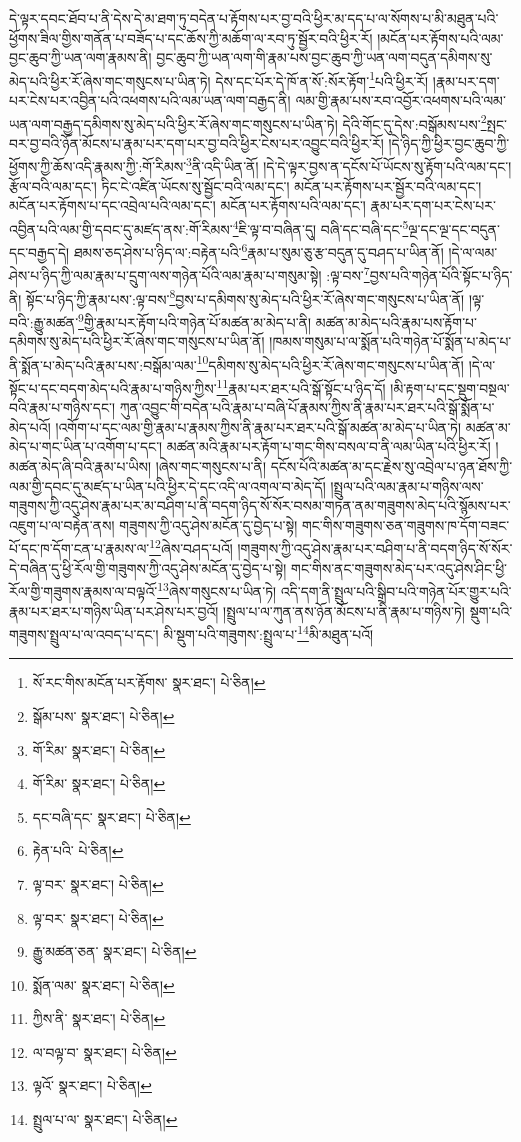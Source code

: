 དེ་ལྟར་དབང་ཐོབ་པ་ནི་དེས་དེ་མ་ཐག་ཏུ་བདེན་པ་རྟོགས་པར་བྱ་བའི་ཕྱིར་མ་དད་པ་ལ་སོགས་པ་མི་མཐུན་པའི་ཕྱོགས་ཟིལ་གྱིས་གནོན་པ་བཟོད་པ་དང་ཆོས་ཀྱི་མཆོག་ལ་རབ་ཏུ་སྦྱོར་བའི་ཕྱིར་རོ། །མངོན་པར་རྟོགས་པའི་ལམ་བྱང་ཆུབ་ཀྱི་ཡན་ལག་རྣམས་ནི། བྱང་ཆུབ་ཀྱི་ཡན་ལག་གི་རྣམ་པས་བྱང་ཆུབ་ཀྱི་ཡན་ལག་བདུན་དམིགས་སུ་མེད་པའི་ཕྱིར་རོ་ཞེས་གང་གསུངས་པ་ཡིན་ཏེ། དེས་དང་པོར་དེ་ཁོ་ན་སོ་:སོར་རྟོག་\footnote{སོ་རང་གིས་མངོན་པར་རྟོགས་  སྣར་ཐང་།  པེ་ཅིན། }པའི་ཕྱིར་རོ། །རྣམ་པར་དག་པར་ངེས་པར་འབྱིན་པའི་འཕགས་པའི་ལམ་ཡན་ལག་བརྒྱད་ནི། ལམ་གྱི་རྣམ་པས་རབ་འབྱོར་འཕགས་པའི་ལམ་ཡན་ལག་བརྒྱད་དམིགས་སུ་མེད་པའི་ཕྱིར་རོ་ཞེས་གང་གསུངས་པ་ཡིན་ཏེ། དེའི་གོང་དུ་དེས་:བསྒོམས་པས་\footnote{སྒོམ་པས་  སྣར་ཐང་།  པེ་ཅིན། }སྤང་བར་བྱ་བའི་ཉོན་མོངས་པ་རྣམ་པར་དག་པར་བྱ་བའི་ཕྱིར་ངེས་པར་འབྱུང་བའི་ཕྱིར་རོ། །དེ་ཉིད་ཀྱི་ཕྱིར་བྱང་ཆུབ་ཀྱི་ཕྱོགས་ཀྱི་ཆོས་འདི་རྣམས་ཀྱི་:གོ་རིམས་\footnote{གོ་རིམ་  སྣར་ཐང་།  པེ་ཅིན། }ནི་འདི་ཡིན་ནོ། །དེ་དེ་ལྟར་བྱས་ན་དངོས་པོ་ཡོངས་སུ་རྟོག་པའི་ལམ་དང་། རྩོལ་བའི་ལམ་དང་། ཏིང་ངེ་འཛིན་ཡོངས་སུ་སྦྱོང་བའི་ལམ་དང་། མངོན་པར་རྟོགས་པར་སྦྱོར་བའི་ལམ་དང་། མངོན་པར་རྟོགས་པ་དང་འབྲེལ་པའི་ལམ་དང་། མངོན་པར་རྟོགས་པའི་ལམ་དང་། རྣམ་པར་དག་པར་ངེས་པར་འབྱིན་པའི་ལམ་གྱི་དབང་དུ་མཛད་ནས་:གོ་རིམས་\footnote{གོ་རིམ་  སྣར་ཐང་།  པེ་ཅིན། }ཇི་ལྟ་བ་བཞིན་དུ། བཞི་དང་བཞི་དང་\footnote{དང་བཞི་དང་  སྣར་ཐང་།  པེ་ཅིན། }ལྔ་དང་ལྔ་དང་བདུན་དང་བརྒྱད་དེ། ཐམས་ཅད་ཤེས་པ་ཉིད་ལ་:བརྟེན་པའི་\footnote{རྟེན་པའི་  པེ་ཅིན། }རྣམ་པ་སུམ་ཅུ་རྩ་བདུན་དུ་བཤད་པ་ཡིན་ནོ། །དེ་ལ་ལམ་ཤེས་པ་ཉིད་ཀྱི་ལམ་རྣམ་པ་དྲུག་ལས་གཉེན་པོའི་ལམ་རྣམ་པ་གསུམ་སྟེ། :ལྟ་བས་\footnote{ལྟ་བར་  སྣར་ཐང་།  པེ་ཅིན། }བྱས་པའི་གཉེན་པོའི་སྟོང་པ་ཉིད་ནི། སྟོང་པ་ཉིད་ཀྱི་རྣམ་པས་:ལྟ་བས་\footnote{ལྟ་བར་  སྣར་ཐང་།  པེ་ཅིན། }བྱས་པ་དམིགས་སུ་མེད་པའི་ཕྱིར་རོ་ཞེས་གང་གསུངས་པ་ཡིན་ནོ། །ལྟ་བའི་:རྒྱུ་མཚན་\footnote{རྒྱུ་མཚན་ཅན་  སྣར་ཐང་།  པེ་ཅིན། }གྱི་རྣམ་པར་རྟོག་པའི་གཉེན་པོ་མཚན་མ་མེད་པ་ནི། མཚན་མ་མེད་པའི་རྣམ་པས་རྟོག་པ་དམིགས་སུ་མེད་པའི་ཕྱིར་རོ་ཞེས་གང་གསུངས་པ་ཡིན་ནོ། །ཁམས་གསུམ་པ་ལ་སྨོན་པའི་གཉེན་པོ་སྨོན་པ་མེད་པ་ནི་སྨོན་པ་མེད་པའི་རྣམ་པས་:བསྒོམ་ལམ་\footnote{སྨོན་ལམ་  སྣར་ཐང་།  པེ་ཅིན། }དམིགས་སུ་མེད་པའི་ཕྱིར་རོ་ཞེས་གང་གསུངས་པ་ཡིན་ནོ། །དེ་ལ་སྟོང་པ་དང་བདག་མེད་པའི་རྣམ་པ་གཉིས་ཀྱིས་\footnote{ཀྱིས་ནི་  སྣར་ཐང་།  པེ་ཅིན། }རྣམ་པར་ཐར་པའི་སྒོ་སྟོང་པ་ཉིད་དོ། །མི་རྟག་པ་དང་སྡུག་བསྔལ་བའི་རྣམ་པ་གཉིས་དང་། ཀུན་འབྱུང་གི་བདེན་པའི་རྣམ་པ་བཞི་པོ་རྣམས་ཀྱིས་ནི་རྣམ་པར་ཐར་པའི་སྒོ་སྨོན་པ་མེད་པའོ། །འགོག་པ་དང་ལམ་གྱི་རྣམ་པ་རྣམས་ཀྱིས་ནི་རྣམ་པར་ཐར་པའི་སྒོ་མཚན་མ་མེད་པ་ཡིན་ཏེ། མཚན་མ་མེད་པ་གང་ཡིན་པ་འགོག་པ་དང་། མཚན་མའི་རྣམ་པར་རྟོག་པ་གང་གིས་བསལ་བ་ནི་ལམ་ཡིན་པའི་ཕྱིར་རོ། །མཚན་མེད་ཞི་བའི་རྣམ་པ་ཡིས། །ཞེས་གང་གསུངས་པ་ནི། དངོས་པོའི་མཚན་མ་དང་རྗེས་སུ་འབྲེལ་པ་ཉན་ཐོས་ཀྱི་ལམ་གྱི་དབང་དུ་མཛད་པ་ཡིན་པའི་ཕྱིར་དེ་དང་འདི་ལ་འགལ་བ་མེད་དོ། །སྤྲུལ་པའི་ལམ་རྣམ་པ་གཉིས་ལས་གཟུགས་ཀྱི་འདུ་ཤེས་རྣམ་པར་མ་བཤིག་པ་ནི་བདག་ཉིད་སོ་སོར་བསམ་གཏན་ནམ་གཟུགས་མེད་པའི་སྙོམས་པར་འཇུག་པ་ལ་བརྟེན་ནས། གཟུགས་ཀྱི་འདུ་ཤེས་མངོན་དུ་བྱེད་པ་སྟེ། གང་གིས་གཟུགས་ཅན་གཟུགས་ཁ་དོག་བཟང་པོ་དང་ཁ་དོག་ངན་པ་རྣམས་ལ་\footnote{ལ་བལྟ་བ་  སྣར་ཐང་།  པེ་ཅིན། }ཞེས་བཤད་པའོ། །གཟུགས་ཀྱི་འདུ་ཤེས་རྣམ་པར་བཤིག་པ་ནི་བདག་ཉིད་སོ་སོར་དེ་བཞིན་དུ་ཕྱི་རོལ་གྱི་གཟུགས་ཀྱི་འདུ་ཤེས་མངོན་དུ་བྱེད་པ་སྟེ། གང་གིས་ནང་གཟུགས་མེད་པར་འདུ་ཤེས་ཤིང་ཕྱི་རོལ་གྱི་གཟུགས་རྣམས་ལ་བལྟའོ་\footnote{ལྟའོ་  སྣར་ཐང་།  པེ་ཅིན། }ཞེས་གསུངས་པ་ཡིན་ཏེ། འདི་དག་ནི་སྤྲུལ་པའི་སྒྲིབ་པའི་གཉེན་པོར་གྱུར་པའི་རྣམ་པར་ཐར་པ་གཉིས་ཡིན་པར་ཤེས་པར་བྱའོ། །སྤྲུལ་པ་ལ་ཀུན་ནས་ཉོན་མོངས་པ་ནི་རྣམ་པ་གཉིས་ཏེ། སྡུག་པའི་གཟུགས་སྤྲུལ་པ་ལ་འབད་པ་དང་། མི་སྡུག་པའི་གཟུགས་:སྤྲུལ་པ་\footnote{སྤྲུལ་པ་ལ་  སྣར་ཐང་།  པེ་ཅིན། }མི་མཐུན་པའོ། 